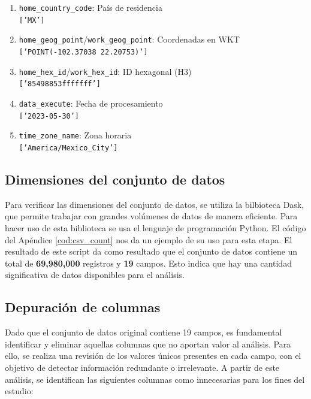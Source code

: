 \begin{enumerate}[leftmargin=*, align=left, noitemsep]
    \item \texttt{home\_country\_code}: País de residencia \\ 
    \footnotesize{\texttt{['MX']}}
    \normalsize

    \item \texttt{home\_geog\_point}/\texttt{work\_geog\_point}: Coordenadas en WKT \\ 
    \footnotesize{\texttt{['POINT(-102.37038 22.20753)']}}
    \normalsize

    \item \texttt{home\_hex\_id}/\texttt{work\_hex\_id}: ID hexagonal (H3) \\ 
    \footnotesize{\texttt{['85498853fffffff']}}
    \normalsize

    \item \texttt{data\_execute}: Fecha de procesamiento \\ 
    \footnotesize{\texttt{['2023-05-30']}}
    \normalsize

    \item \texttt{time\_zone\_name}: Zona horaria \\ 
    \footnotesize{\texttt{['America/Mexico\_City']}}
    \normalsize
\end{enumerate}
\vfill

\subsection{Dimensiones del conjunto de datos}
\label{subsec:dimensiones}
Para verificar las dimensiones del conjunto de datos, se utiliza la bilbioteca Dask, que permite trabajar con grandes volúmenes de datos de manera eficiente. Para hacer uso de esta biblioteca se usa el lenguaje de programación Python. El código del Apéndice \ref{cod:csv_count} nos da un ejemplo de su uso para esta etapa. El resultado de este script da como resultado que el conjunto de datos contiene un total de \textbf{69,980,000} registros y \textbf{19} campos. Esto indica que hay una cantidad significativa de datos disponibles para el análisis.

\subsection{Depuración de columnas}
\label{subsec:depuracion_columnas}
Dado que el conjunto de datos original contiene 19 campos, es fundamental identificar y eliminar aquellas columnas que no aportan valor al análisis. Para ello, se realiza una revisión de los valores únicos presentes en cada campo, con el objetivo de detectar información redundante o irrelevante. A partir de este análisis, se identifican las siguientes columnas como innecesarias para los fines del estudio:

